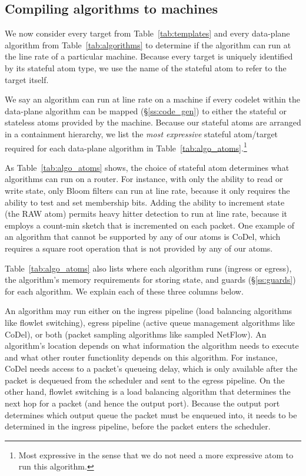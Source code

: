 \subsection{Compiling \pktlanguage algorithms to \absmachine machines}
\label{domino_ss:compiler}
We now consider every target from Table~\ref{tab:templates} and every
data-plane algorithm from Table~\ref{tab:algorithms} to determine if the
algorithm can run at the line rate of a particular \absmachine machine. Because
every target is uniquely identified by its stateful atom type, we use the name
of the stateful atom to refer to the target itself.

We say an algorithm can run at line rate on a \absmachine machine if every
codelet within the data-plane algorithm can be mapped (\S\ref{ss:code_gen}) to
either the stateful or stateless atoms provided by the \absmachine machine.
Because our stateful atoms are arranged in a containment hierarchy, we list the
\textit{most expressive} stateful atom/target required for each data-plane
algorithm in Table~\ref{tab:algo_atoms}.\footnote{Most expressive in the sense
that we do not need a more expressive atom to run this algorithm.}


As Table~\ref{tab:algo_atoms} shows, the choice of stateful atom determines
what algorithms can run on a router. For instance, with only the ability to
read or write state, only Bloom filters can run at line rate, because it only
requires the ability to test and set membership bits.  Adding the ability to
increment state (the RAW atom) permits heavy hitter detection to run at line
rate, because it employs a count-min sketch that is incremented on each packet.
One example of an algorithm that cannot be supported by any of our atoms is
CoDel, which requires a square root operation that is not provided by any of
our atoms.

Table~\ref{tab:algo_atoms} also lists where each algorithm runs (ingress or
egress), the algorithm's memory requirements for storing state, and guards
(\S\ref{ss:guards}) for each algorithm. We explain each of these three columns
below.

An algorithm may run either on the ingress pipeline (\eg load balancing
algorithms like flowlet switching), egress pipeline (\eg active queue
management algorithms like CoDel), or both (\eg packet sampling algorithms like
sampled NetFlow). An algorithm's location depends on what information the
algorithm needs to execute and what other router functionlity depends on this
algorithm. For instance, CoDel needs access to a packet's queueing delay, which
is only available after the packet is dequeued from the scheduler and sent to
the egress pipeline. On the other hand, flowlet switching is a load balancing
algorithm that determines the next hop for a packet (and hence the output
port). Because the output port determines which output queue the packet must be
enqueued into, it needs to be determined in the ingress pipeline, before the
packet enters the scheduler.

